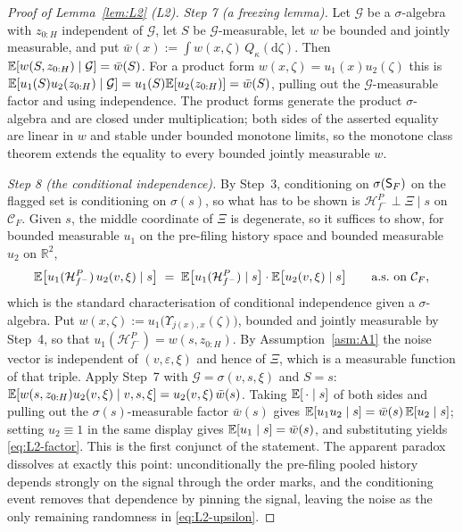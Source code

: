 \begin{proof}[Proof of Lemma~\ref{lem:L2} (L2)]
\emph{Step 7 (a freezing lemma).} Let $\mathcal G$ be a $\sigma$-algebra with $z_{0:H}$ independent
of $\mathcal G$, let $S$ be $\mathcal G$-measurable, let $w$ be bounded and jointly measurable, and
put $\bar w(x) := \int w(x,\zeta)\,Q_\kappa(\mathrm d\zeta)$. Then
$\mathbb{E}[w(S,z_{0:H}) \mid \mathcal G] = \bar w(S)$. For a product form $w(x,\zeta) = u_1(x)u_2(\zeta)$
this is
$\mathbb{E}[u_1(S)u_2(z_{0:H}) \mid \mathcal G] = u_1(S)\mathbb{E}[u_2(z_{0:H})] = \bar w(S)$, pulling out the
$\mathcal G$-measurable factor and using independence. The product forms generate the product
$\sigma$-algebra and are closed under multiplication; both sides of the asserted equality are linear
in $w$ and stable under bounded monotone limits, so the monotone class theorem extends the equality
to every bounded jointly measurable $w$.

\emph{Step 8 (the conditional independence).} By Step~3, conditioning on $\sigma(\mathsf{S}_F)$ on the
flagged set is conditioning on $\sigma(s)$, so what has to be shown is
$\mathcal H_{f^-}^P \perp \Xi \mid s$ on $\mathcal C_F$. Given $s$, the middle coordinate of $\Xi$ is
degenerate, so it suffices to show, for bounded measurable $u_1$ on the pre-filing history space and
bounded measurable $u_2$ on $\mathbb R^2$,
\begin{equation}
\label{eq:L2-factor}
\mathbb{E}\bigl[u_1(\mathcal H_{f^-}^P)\,u_2(v,\xi) \mid s\bigr]
 \;=\; \mathbb{E}\bigl[u_1(\mathcal H_{f^-}^P) \mid s\bigr]\cdot\mathbb{E}\bigl[u_2(v,\xi) \mid s\bigr]
 \qquad \text{a.s.\ on } \mathcal C_F,
\end{equation}
which is the standard characterisation of conditional independence given a $\sigma$-algebra. Put
$w(x,\zeta) := u_1\bigl(\Upsilon_{j(x),x}(\zeta)\bigr)$, bounded and jointly measurable by Step~4, so
that $u_1(\mathcal H_{f^-}^P) = w(s,z_{0:H})$. By Assumption~\ref{asm:A1} the noise vector is
independent of $(v,\varepsilon,\xi)$ and hence of $\Xi$, which is a measurable function of that
triple. Apply Step~7 with $\mathcal G = \sigma(v,s,\xi)$ and $S = s$:
$\mathbb{E}[w(s,z_{0:H})u_2(v,\xi) \mid v,s,\xi] = u_2(v,\xi)\,\bar w(s)$. Taking
$\mathbb{E}[\,\cdot \mid s]$ of both sides and pulling out the $\sigma(s)$-measurable factor $\bar w(s)$
gives $\mathbb{E}[u_1u_2 \mid s] = \bar w(s)\,\mathbb{E}[u_2 \mid s]$; setting $u_2 \equiv 1$ in the same display
gives $\mathbb{E}[u_1 \mid s] = \bar w(s)$, and substituting yields \eqref{eq:L2-factor}. This is the first
conjunct of the statement. The apparent paradox dissolves at exactly this point: unconditionally the
pre-filing pooled history depends strongly on the signal through the order marks, and the
conditioning event removes that dependence by pinning the signal, leaving the noise as the only
remaining randomness in \eqref{eq:L2-upsilon}.


\end{proof}

